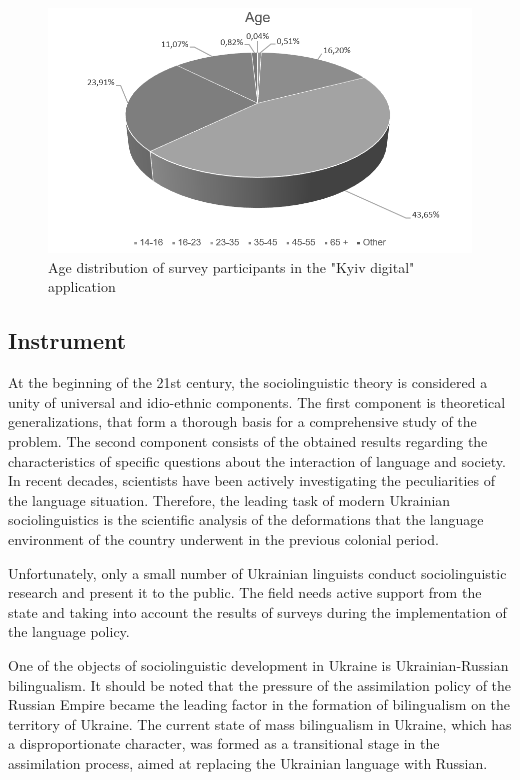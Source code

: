 \documentclass[english]{textolivre}
\begin{document}
\begin{figure}[htbp]
\centering
\begin{minipage}{.8\textwidth}
 \includegraphics[width=\textwidth]{Fig1.png}
 \caption{Age distribution of survey participants in the "Kyiv digital" application}
 \label{fig1}
\end{minipage}
\end{figure}


\subsection{Instrument}
At the beginning of the 21st century, the sociolinguistic theory is considered a unity of universal and idio-ethnic components. The first component is theoretical generalizations, that form a thorough basis for a comprehensive study of the problem. The second component consists of the obtained results regarding the characteristics of specific questions about the interaction of language and society. In recent decades, scientists have been actively investigating the peculiarities of the language situation. Therefore, the leading task of modern Ukrainian sociolinguistics is the scientific analysis of the deformations that the language environment of the country underwent in the previous colonial period.

Unfortunately, only a small number of Ukrainian linguists conduct sociolinguistic research and present it to the public. The field needs active support from the state and taking into account the results of surveys during the implementation of the language policy.

One of the objects of sociolinguistic development in Ukraine is Ukrainian-Russian bilingualism. It should be noted that the pressure of the assimilation policy of the Russian Empire became the leading factor in the formation of bilingualism on the territory of Ukraine. The current state of mass bilingualism in Ukraine, which has a disproportionate character, was formed as a transitional stage in the assimilation process, aimed at replacing the Ukrainian language with Russian.
\end{document}
